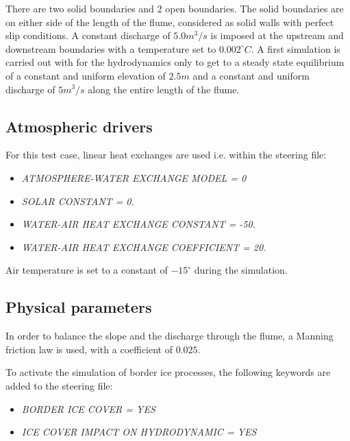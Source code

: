 There are two solid boundaries and 2 open boundaries.
The solid boundaries are on either side of the length of the flume, considered as solid walls with perfect slip conditions.
A constant discharge of $5.0m^3/s$ is imposed at the upstream and downstream boundaries with a temperature set to $0.002^{\circ} C$.
A first simulation is carried out with for the hydrodynamics only to get to a steady state equilibrium of a constant and uniform elevation of $2.5m$ and a constant and uniform discharge of $5m^3/s$ along the entire length of the flume.

\subsection{Atmospheric drivers}

For this test case, linear heat exchanges are used i.e. within the \khione steering file:
\begin{itemize}
	\item\textit{ATMOSPHERE-WATER EXCHANGE MODEL = 0}
	\item\textit{SOLAR CONSTANT = 0.}
	\item\textit{WATER-AIR HEAT EXCHANGE CONSTANT = -50.}
	\item\textit{WATER-AIR HEAT EXCHANGE COEFFICIENT = 20.}
\end{itemize}
Air temperature is set to a constant of $-15^{\circ}$ during the simulation.

\subsection{Physical parameters}

In order to balance the slope and the discharge through the flume, a Manning friction law is used, with a coefficient of $0.025$.

To activate the simulation of border ice processes, the following keywords are added to the \khione steering file:
\begin{itemize}
	\item\textit{BORDER ICE COVER = YES}
    \item\textit{ICE COVER IMPACT ON HYDRODYNAMIC = YES}
\end{itemize}

